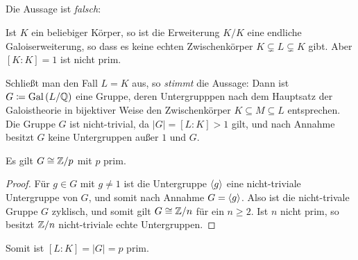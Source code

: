 \subsection{}

Die Aussage ist \emph{falsch}:

Ist $K$ ein beliebiger Körper, so ist die Erweiterung $K/K$ eine endliche Galoiserweiterung, so dass es keine echten Zwischenkörper $K \subsetneq L \subsetneq K$ gibt.
Aber $[K : K] = 1$ ist nicht prim.

\begin{remark}
  Schließt man den Fall $L = K$ aus, so \emph{stimmt} die Aussage:
  Dann ist $G \coloneqq \operatorname{Gal}{(}L/\mathbb{Q})$ eine Gruppe, deren Untergrupppen nach dem Hauptsatz der Galoistheorie in bijektiver Weise den Zwischenkörper $K \subseteq M \subseteq L$ entsprechen.
  Die Gruppe $G$ ist nicht-trivial, da $|G| = [L:K] > 1$ gilt, und nach Annahme besitzt $G$ keine Untergruppen außer $1$ und $G$.
  \begin{claim*}
    Es gilt $G \cong \mathbb{Z}/p$ mit $p$ prim.
  \end{claim*}
  \begin{proof}
    Für $g \in G$ mit $g \neq 1$ ist die Untergruppe $\langle g\rangle$ eine nicht-triviale Untergruppe von $G$, und somit nach Annahme $G = \langle g\rangle$.
    Also ist die nicht-trivale Gruppe $G$ zyklisch, und somit gilt $G \cong \mathbb{Z}/n$ für ein $n \geq 2$.
    Ist $n$ nicht prim, so besitzt $\mathbb{Z}/n$ nicht-triviale echte Untergruppen.
  \end{proof}
  Somit ist $[L : K] = |G| = p$ prim.
\end{remark}






